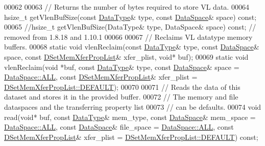 \begin{DoxyCode}
00062 
00063         \textcolor{comment}{// Returns the number of bytes required to store VL data.}
00064         hsize\_t getVlenBufSize(\textcolor{keyword}{const} \hyperlink{class_h5_1_1_data_type}{DataType}& type, \textcolor{keyword}{const} \hyperlink{class_h5_1_1_data_space}{DataSpace}& space) \textcolor{keyword}{const};
00065         \textcolor{comment}{//hsize\_t getVlenBufSize(DataType& type, DataSpace& space) const; // removed from 1.8.18 and 1.10.1}
00066 
00067         \textcolor{comment}{// Reclaims VL datatype memory buffers.}
00068         \textcolor{keyword}{static} \textcolor{keywordtype}{void} vlenReclaim(\textcolor{keyword}{const} \hyperlink{class_h5_1_1_data_type}{DataType}& type, \textcolor{keyword}{const} \hyperlink{class_h5_1_1_data_space}{DataSpace}& space, \textcolor{keyword}{const} 
      \hyperlink{class_h5_1_1_d_set_mem_xfer_prop_list}{DSetMemXferPropList}& xfer\_plist, \textcolor{keywordtype}{void}* buf);
00069         \textcolor{keyword}{static} \textcolor{keywordtype}{void} vlenReclaim(\textcolor{keywordtype}{void} *buf, \textcolor{keyword}{const} \hyperlink{class_h5_1_1_data_type}{DataType}& type, \textcolor{keyword}{const} 
      \hyperlink{class_h5_1_1_data_space}{DataSpace}& space = \hyperlink{class_h5_1_1_data_space_ae8a22405edd631eb923a327d39462ff2}{DataSpace::ALL}, \textcolor{keyword}{const} 
      \hyperlink{class_h5_1_1_d_set_mem_xfer_prop_list}{DSetMemXferPropList}& xfer\_plist = 
      \hyperlink{class_h5_1_1_d_set_mem_xfer_prop_list_ae69bf0ec7bccd4bb793ffe1ff770d8c4}{DSetMemXferPropList::DEFAULT});
00070 
00071         \textcolor{comment}{// Reads the data of this dataset and stores it in the provided buffer.}
00072         \textcolor{comment}{// The memory and file dataspaces and the transferring property list}
00073         \textcolor{comment}{// can be defaults.}
00074         \textcolor{keywordtype}{void} read(\textcolor{keywordtype}{void}* buf, \textcolor{keyword}{const} \hyperlink{class_h5_1_1_data_type}{DataType}& mem\_type, \textcolor{keyword}{const} \hyperlink{class_h5_1_1_data_space}{DataSpace}& mem\_space = 
      \hyperlink{class_h5_1_1_data_space_ae8a22405edd631eb923a327d39462ff2}{DataSpace::ALL}, \textcolor{keyword}{const} \hyperlink{class_h5_1_1_data_space}{DataSpace}& file\_space = 
      \hyperlink{class_h5_1_1_data_space_ae8a22405edd631eb923a327d39462ff2}{DataSpace::ALL}, \textcolor{keyword}{const} \hyperlink{class_h5_1_1_d_set_mem_xfer_prop_list}{DSetMemXferPropList}& xfer\_plist = 
      \hyperlink{class_h5_1_1_d_set_mem_xfer_prop_list_ae69bf0ec7bccd4bb793ffe1ff770d8c4}{DSetMemXferPropList::DEFAULT}) \textcolor{keyword}{const};

\end{DoxyCode}
